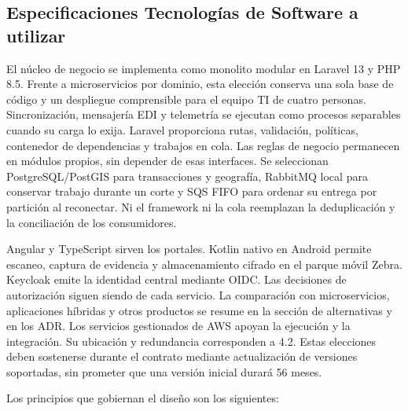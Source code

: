 \subsection{Especificaciones Tecnologías de Software a utilizar}
\label{subsec:tecnologias-software}

El núcleo de negocio se implementa como monolito modular en Laravel 13 y PHP 8.5. Frente a microservicios por dominio, esta elección conserva una sola base de código y un despliegue comprensible para el equipo TI de cuatro personas. Sincronización, mensajería EDI y telemetría se ejecutan como procesos separables cuando su carga lo exija. Laravel proporciona rutas, validación, políticas, contenedor de dependencias y trabajos en cola. Las reglas de negocio permanecen en módulos propios, sin depender de esas interfaces. Se seleccionan PostgreSQL/PostGIS para transacciones y geografía, RabbitMQ local para conservar trabajo durante un corte y SQS FIFO para ordenar su entrega por partición al reconectar. Ni el framework ni la cola reemplazan la deduplicación y la conciliación de los consumidores.

Angular y TypeScript sirven los portales. Kotlin nativo en Android permite escaneo, captura de evidencia y almacenamiento cifrado en el parque móvil Zebra. Keycloak emite la identidad central mediante OIDC. Las decisiones de autorización siguen siendo de cada servicio. La comparación con microservicios, aplicaciones híbridas y otros productos se resume en la sección de alternativas y en los ADR. Los servicios gestionados de AWS apoyan la ejecución y la integración. Su ubicación y redundancia corresponden a 4.2. Estas elecciones deben sostenerse durante el contrato mediante actualización de versiones soportadas, sin prometer que una versión inicial durará 56 meses.

Los principios que gobiernan el diseño son los siguientes:


